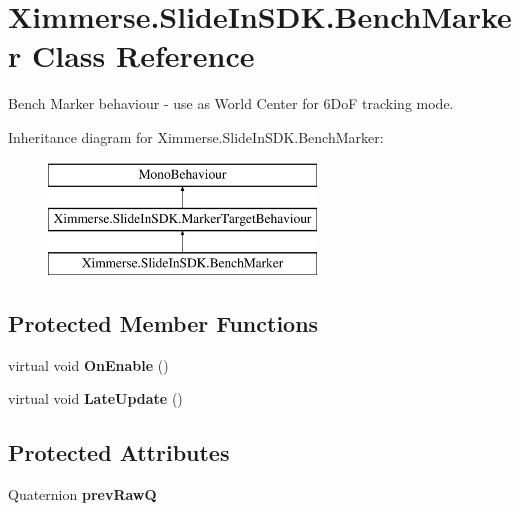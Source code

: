 \hypertarget{class_ximmerse_1_1_slide_in_s_d_k_1_1_bench_marker}{}\section{Ximmerse.\+Slide\+In\+S\+D\+K.\+Bench\+Marker Class Reference}
\label{class_ximmerse_1_1_slide_in_s_d_k_1_1_bench_marker}


Bench Marker behaviour -\/ use as World Center for 6\+DoF tracking mode.  


Inheritance diagram for Ximmerse.\+Slide\+In\+S\+D\+K.\+Bench\+Marker\+:\begin{figure}[H]
\begin{center}
\leavevmode
\includegraphics[height=3.000000cm]{class_ximmerse_1_1_slide_in_s_d_k_1_1_bench_marker}
\end{center}
\end{figure}
\subsection*{Protected Member Functions}
\begin{DoxyCompactItemize}
\item 
\mbox{\label{class_ximmerse_1_1_slide_in_s_d_k_1_1_bench_marker_a73cb9fdc1f88095ad5cbbffd2eaf7c01}} 
virtual void {\bfseries On\+Enable} ()
\item 
\mbox{\label{class_ximmerse_1_1_slide_in_s_d_k_1_1_bench_marker_a6b297139723fbf2a8cf5b8efcf6f9505}} 
virtual void {\bfseries Late\+Update} ()
\end{DoxyCompactItemize}
\subsection*{Protected Attributes}
\begin{DoxyCompactItemize}
\item 
\mbox{\label{class_ximmerse_1_1_slide_in_s_d_k_1_1_bench_marker_a040c29d3121ee3cc756262585b270d39}} 
Quaternion {\bfseries prev\+RawQ}
\end{DoxyCompactItemize}
